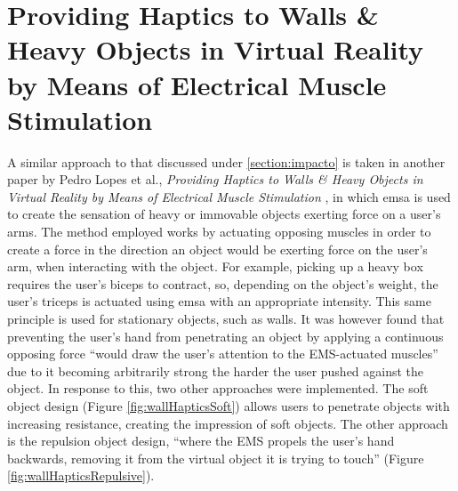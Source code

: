 \section{Providing Haptics to Walls \& Heavy Objects in Virtual Reality by Means of Electrical Muscle Stimulation}
                        
A similar approach to that discussed under \autoref{section:impacto} is taken in another paper by Pedro Lopes et al., \textit{Providing Haptics to Walls \& Heavy Objects in Virtual Reality by Means of Electrical Muscle Stimulation} \autocite{wallHaptics}, in which \gls{emsa} is used to create the sensation of heavy or immovable objects exerting force on a user's arms.
\newline
The method employed works by actuating opposing muscles in order to create a force in the direction an object would be exerting force on the user's arm, when interacting with the object. For example, picking up a heavy box requires the user's biceps to contract, so, depending on the object's weight, the user's triceps is actuated using \gls{emsa} with an appropriate intensity. This same principle is used for stationary objects, such as walls.
\newline
It was however found that preventing the user's hand from penetrating an object by applying a continuous opposing force \enquote{would draw the user’s attention to the EMS-actuated muscles} \autocite[p. ~2]{wallHaptics} due to it becoming arbitrarily strong the harder the user pushed against the object.
In response to this, two other approaches were implemented. The soft object design (Figure \autoref{fig:wallHapticsSoft}) allows users to penetrate objects with increasing resistance, creating the impression of soft objects. The other approach is the repulsion object design, \enquote{where the EMS propels the user’s hand backwards, removing it from the virtual object it is trying to touch} \autocite[p. ~3]{wallHaptics} (Figure \autoref{fig:wallHapticsRepulsive}).

